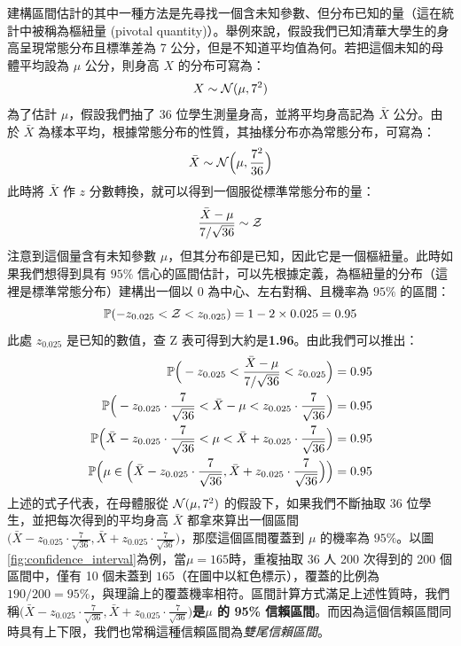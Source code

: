     建構區間估計的其中一種方法是先尋找一個含未知參數、但分布已知的量（這在統計中被稱為樞紐量 (pivotal quantity)）。舉例來說，假設我們已知清華大學生的身高呈現常態分布且標準差為 7 公分，但是不知道平均值為何。若把這個未知的母體平均設為 $\mu$ 公分，則身高 $X$ 的分布可寫為：
    \smallskip
    \[X \sim \mathcal{N}(\mu, 7^2)\]
    \smallskip
    為了估計 $\mu$，假設我們抽了 36 位學生測量身高，並將平均身高記為 $\bar{X}$ 公分。由於 $\bar{X}$ 為樣本平均，根據常態分布的性質，其抽樣分布亦為常態分布，可寫為：
    \smallskip
    \[\bar{X} \sim \mathcal{N}\Big(\mu, \frac{7^2}{36}\Big)\]
    \smallskip
    此時將 $\bar{X}$ 作 $z$ 分數轉換，就可以得到一個服從標準常態分布的量：
    \smallskip
    \[\frac{\bar{X} - \mu}{7/\sqrt{36}} \sim \mathcal{Z}\]
    \smallskip
    注意到這個量含有未知參數 $\mu$，但其分布卻是已知，因此它是一個樞紐量。此時如果我們想得到具有 $95\%$ 信心的區間估計，可以先根據定義，為樞紐量的分布（這裡是標準常態分布）建構出一個以 $0$ 為中心、左右對稱、且機率為 $95\%$ 的區間：
    \smallskip
    \[\mathbb{P}(-z_{0.025} < \mathcal{Z} < z_{0.025}) = 1-2 \times 0.025 = 0.95\]
    \smallskip
    此處 $z_{0.025}$ 是已知的數值，查 Z 表可得到大約是\textbf{1.96}。由此我們可以推出：
    \smallskip
    \begin{align*}
        \mathbb{P}\Big(-z_{0.025} < \frac{\bar{X} - \mu}{7/\sqrt{36}} < z_{0.025}\Big) &= 0.95\\
        \mathbb{P}\Big(-z_{0.025}\cdot \frac{7}{\sqrt{36}} < \bar{X} - \mu < z_{0.025}\cdot \frac{7}{\sqrt{36}}\Big) &= 0.95\\
        \mathbb{P}\Big(\bar{X}-z_{0.025}\cdot \frac{7}{\sqrt{36}} < \mu < \bar{X} + z_{0.025}\cdot \frac{7}{\sqrt{36}}\Big) &= 0.95\\
        \mathbb{P}\Big(\mu \in \Big(\bar{X}-z_{0.025}\cdot \frac{7}{\sqrt{36}},  \bar{X} + z_{0.025}\cdot \frac{7}{\sqrt{36}}\Big)\Big) &= 0.95
    \end{align*}
    \smallskip
    上述的式子代表，在母體服從 $\mathcal{N}(\mu, 7^2)$ 的假設下，如果我們不斷抽取 36 位學生，並把每次得到的平均身高 $\bar{X}$ 都拿來算出一個區間 $\big(\bar{X}-z_{0.025}\cdot \frac{7}{\sqrt{36}},  \bar{X} + z_{0.025}\cdot \frac{7}{\sqrt{36}}\big)$，那麼這個區間覆蓋到 $\mu$ 的機率為 $95\%$。以圖\ref{fig:confidence_interval}為例，當$\mu = 165$時，重複抽取 36 人 200 次得到的 200 個區間中，僅有 10 個未蓋到 $165$（在圖中以紅色標示），覆蓋的比例為 $190/200 = 95\%$，與理論上的覆蓋機率相符。區間計算方式滿足上述性質時，我們稱\textbf{$\big(\bar{X}-z_{0.025}\cdot \frac{7}{\sqrt{36}},  \bar{X} + z_{0.025}\cdot \frac{7}{\sqrt{36}}\big)$是$\mu$ 的 95\% 信賴區間}。而因為這個信賴區間同時具有上下限，我們也常稱這種信賴區間為\textit{雙尾信賴區間}。
    
